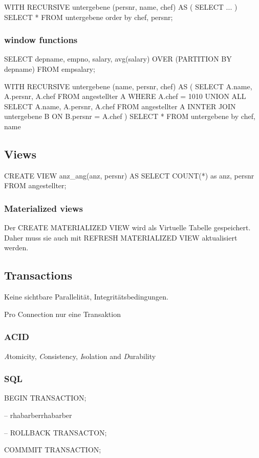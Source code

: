 \begin{multicols}{2}
	WITH RECURSIVE untergebene (persnr, name, chef) AS
	(
	SELECT ...
	)
	SELECT * FROM untergebene order by chef, persnr;

\subsubsection{window functions}
	SELECT depname, empno, salary, avg(salary) OVER (PARTITION BY depname) FROM empsalary;
	
	WITH RECURSIVE untergebene (name, persnr, chef) AS
	(
		SELECT A.name, A.persnr, A.chef FROM angestellter A
			WHERE A.chef = 1010
		UNION ALL
		SELECT A.name, A.persnr, A.chef FROM angestellter A
			INNTER JOIN untergebene B ON B.persnr = A.chef
	)
	SELECT * FROM untergebene by chef, name


\subsection{Views}
	CREATE VIEW anz\_ang(anz, persnr) AS 
	  SELECT COUNT(*) as anz, persnr FROM angestellter;

\subsubsection{Materialized views}
	Der CREATE MATERIALIZED VIEW wird als Virtuelle Tabelle gespeichert. Daher muss sie auch mit REFRESH MATERIALIZED VIEW aktualisiert werden.

\subsection{Transactions}

	Keine sichtbare Parallelität, Integritätsbedingungen.
	
	Pro Connection nur eine Transaktion
	
	\subsubsection{ACID}
	\emph{A}tomicity, \emph{C}onsistency, \emph{I}solation and \emph{D}urability

	\subsubsection{SQL}
		BEGIN TRANSACTION;
		
		-- rhabarberrhabarber
		
		-- ROLLBACK TRANSACTON;
		
		COMMMIT TRANSACTION;

\end{multicols}
